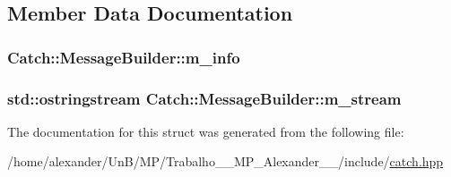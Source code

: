 \subsection{Member Data Documentation}
\hypertarget{structCatch_1_1MessageBuilder_a979f1c2b36d78f80ee275bfa5ba0209f}{
\subsubsection[{m\-\_\-info}]{ Catch\-::\-Message\-Builder\-::m\-\_\-info}}\label{structCatch_1_1MessageBuilder_a979f1c2b36d78f80ee275bfa5ba0209f}
\hypertarget{structCatch_1_1MessageBuilder_a6488ab0cc4ea52affc9c0612c7c5df6b}{
\subsubsection[{m\-\_\-stream}]{\setlength{\rightskip}{0pt plus 5cm}std\-::ostringstream Catch\-::\-Message\-Builder\-::m\-\_\-stream}}\label{structCatch_1_1MessageBuilder_a6488ab0cc4ea52affc9c0612c7c5df6b}


The documentation for this struct was generated from the following file\-:\begin{DoxyCompactItemize}
\item 
/home/alexander/\-Un\-B/\-M\-P/\-Trabalho\-\_\-\_\-\-M\-P\-\_\-\-Alexander\-\_\-\_/include/\hyperlink{catch_8hpp}{catch.\-hpp}\end{DoxyCompactItemize}
